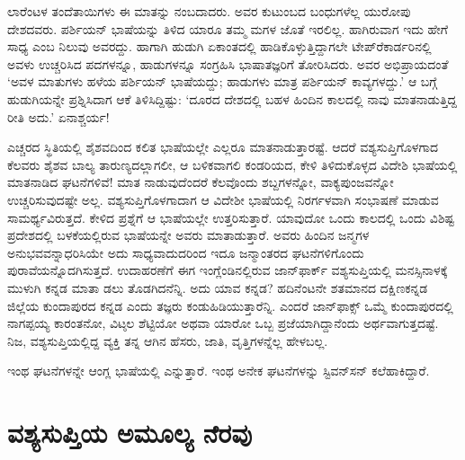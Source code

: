 ಲಾರೆಂಟಳ ತಂದೆತಾಯಿಗಳು ಈ ಮಾತನ್ನು ನಂಬದಾದರು. ಅವರ ಕುಟುಂಬದ ಬಂಧುಗಳೆಲ್ಲ ಯುರೋಪು ದೇಶದವರು. ಪರ್ಶಿಯನ್ ಭಾಷೆಯನ್ನು ತಿಳಿದ ಯಾರೂ ತಮ್ಮ ಮಗಳ ಜೊತೆ ಇರಲಿಲ್ಲ. ಹಾಗಿರುವಾಗ ಇದು ಹೇಗೆ ಸಾಧ್ಯ ಎಂಬ ನಿಲುವು ಅವರದ್ದು. ಹಾಗಾಗಿ ಹುಡುಗಿ ಏಕಾಂತದಲ್ಲಿ ಹಾಡಿಕೊಳ್ಳುತ್ತಿದ್ದಾಗಲೇ ಟೇಪ್​ರೆಕಾರ್ಡರಿನಲ್ಲಿ ಅವಳು ಉಚ್ಚರಿಸಿದ ಪದಗಳನ್ನೂ, ಹಾಡುಗಳನ್ನೂ ಸಂಗ್ರಹಿಸಿ ಭಾಷಾತಜ್ಞರಿಗೆ ತೋರಿಸಿದರು. ಅವರ ಅಭಿಪ್ರಾಯದಂತೆ ‘ಅವಳ ಮಾತುಗಳು ಹಳೆಯ ಪರ್ಶಿಯನ್ ಭಾಷೆಯದ್ದು; ಹಾಡುಗಳು ಮಾತ್ರ ಪರ್ಶಿಯನ್ ಕಾವ್ಯಗಳದ್ದು.’ ಆ ಬಗ್ಗೆ ಹುಡುಗಿಯನ್ನೇ ಪ್ರಶ್ನಿಸಿದಾಗ ಆಕೆ ತಿಳಿಸಿದ್ದಿಷ್ಟು: ‘ದೂರದ ದೇಶದಲ್ಲಿ ಬಹಳ ಹಿಂದಿನ ಕಾಲದಲ್ಲಿ ನಾವು ಮಾತನಾಡುತ್ತಿದ್ದ ರೀತಿ ಅದು.’ ಏನಾಶ್ಚರ್ಯ!

ಎಚ್ಚರದ ಸ್ಥಿತಿಯಲ್ಲಿ ಶೈಶವದಿಂದ ಕಲಿತ ಭಾಷೆಯಲ್ಲೇ ಎಲ್ಲರೂ ಮಾತನಾಡುತ್ತಾರಷ್ಟೆ. ಆದರೆ ವಶ್ಯಸುಪ್ತಿಗೊಳಗಾದ ಕೆಲವರು ಶೈಶವ ಬಾಲ್ಯ ತಾರುಣ್ಯದಲ್ಲಾಗಲೀ, ಆ ಬಳಿಕವಾಗಲಿ ಕಂಡರಿಯದ, ಕೇಳಿ ತಿಳಿದುಕೊಳ್ಳದ ವಿದೇಶಿ ಭಾಷೆಯಲ್ಲಿ ಮಾತನಾಡಿದ ಘಟನೆಗಳಿವೆ! ಮಾತ ನಾಡುವುದೆಂದರೆ ಕೆಲವೊಂದು ಶಬ್ದಗಳನ್ನೋ, ವಾಕ್ಯಪುಂಜವನ್ನೋ ಉಚ್ಚರಿಸುವುದಷ್ಟೇ ಅಲ್ಲ. ವಶ್ಯಸುಪ್ತಿಗೊಳಗಾದಾಗ ಆ ವಿದೇಶೀ ಭಾಷೆಯಲ್ಲಿ ನಿರರ್ಗಳವಾಗಿ ಸಂಭಾಷಣೆ ಮಾಡುವ ಸಾಮರ್ಥ್ಯವಿರುತ್ತದೆ. ಕೇಳಿದ ಪ್ರಶ್ನೆಗೆ ಆ ಭಾಷೆಯಲ್ಲೇ ಉತ್ತರಿಸುತ್ತಾರೆ. ಯಾವುದೋ ಒಂದು ಕಾಲದಲ್ಲಿ ಒಂದು ವಿಶಿಷ್ಟ ಪ್ರದೇಶದಲ್ಲಿ ಬಳಕೆಯಲ್ಲಿರುವ ಭಾಷೆಯನ್ನೇ ಅವರು ಮಾತಾಡುತ್ತಾರೆ. ಅವರು ಹಿಂದಿನ ಜನ್ಮಗಳ ಅನುಭವವನ್ನಾಧರಿಸಿಯೇ ಅದು ಸಾಧ್ಯವಾದುದರಿಂದ ಇದೂ ಜನ್ಮಾಂತರದ ಘಟನೆಗಳಿಗೊಂದು ಪುರಾವೆಯನ್ನೊದಗಿಸುತ್ತದೆ. ಉದಾಹರಣೆಗೆ ಈಗ ಇಂಗ್ಲೆಂಡಿನಲ್ಲಿರುವ ಜಾನ್​ಫಾರ್ಕ್ ವಶ್ಯಸುಪ್ತಿಯಲ್ಲಿ ಮನಸ್ಸಿನಾಳಕ್ಕೆ ಮುಳುಗಿ ಕನ್ನಡ ಮಾತಾ ಡಲು ತೊಡಗಿದನೆನ್ನಿ. ಅದು ಯಾವ ಕನ್ನಡ? ಹದಿನೆಂಟನೇ ಶತಮಾನದ ದಕ್ಷಿಣಕನ್ನಡ ಜಿಲ್ಲೆಯ ಕುಂದಾಪುರದ ಕನ್ನಡ ಎಂದು ತಜ್ಞರು ಕಂಡುಹಿಡಿಯುತ್ತಾರೆನ್ನಿ. ಎಂದರೆ ಜಾನ್​ಫಾಕ್ಸ್ ಒಮ್ಮೆ ಕುಂದಾಪುರದಲ್ಲಿ ನಾಗಪ್ಪಯ್ಯ ಕಾರಂತನೋ, ವಿಟ್ಠಲ ಶೆಟ್ಟಿಯೋ ಅಥವಾ ಯಾರೋ ಒಬ್ಬ ಪ್ರಜೆಯಾಗಿದ್ದಾನೆಂದು ಅರ್ಥವಾಗುತ್ತದಷ್ಟೆ. ನಿಜ, ವಶ್ಯಸುಪ್ತಿಯಲ್ಲಿದ್ದ ವ್ಯಕ್ತಿ ತನ್ನ ಆಗಿನ ಹೆಸರು, ಜಾತಿ, ವೃತ್ತಿಗಳನ್ನೆಲ್ಲ ಹೇಳಬಲ್ಲ.

ಇಂಥ ಘಟನೆಗಳನ್ನೇ ಆಂಗ್ಲ ಭಾಷೆಯಲ್ಲಿ  ಎನ್ನುತ್ತಾರೆ. ಇಂಥ ಅನೇಕ ಘಟನೆಗಳನ್ನು ಸ್ಟಿವನ್​ಸನ್ ಕಲೆಹಾಕಿದ್ದಾರೆ.


\section{ವಶ್ಯಸುಪ್ತಿಯ ಅಮೂಲ್ಯ ನೆರವು}

